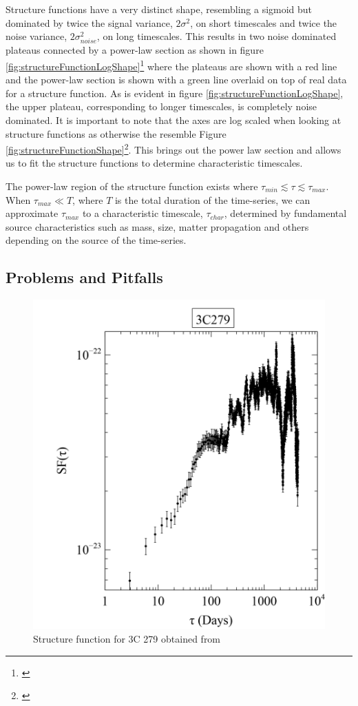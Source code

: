 \documentclass[12pt, oneside]{smuthesis}
\begin{document}
Structure functions have a very distinct shape, resembling a sigmoid but dominated by twice the signal variance, $2\sigma^{2}$, on short timescales and twice the noise variance, $2\sigma_{noise}^{2}$, on long timescales. This results in two noise dominated plateaus connected by a power-law section as shown in figure \ref{fig:structureFunctionLogShape}\footnote{\cite{galloblue}} where the plateaus are shown with a red line and the power-law section is shown with a green line overlaid on top of real data for a structure function. As is evident in figure \ref{fig:structureFunctionLogShape}, the upper plateau, corresponding to longer timescales, is completely noise dominated. It is important to note that the axes are log scaled when looking at structure functions as otherwise the resemble Figure \ref{fig:structureFunctionShape}\footnote{\cite{galloblue}}. This brings out the power law section and allows us to fit the structure functions to determine characteristic timescales.

The power-law region of the structure function exists where $\tau_{min}\lesssim\tau\lesssim\tau_{max}$. When $\tau_{max}\ll T$, where $T$ is the total duration of the time-series, we can approximate $\tau_{max}$ to a characteristic timescale, $\tau_{char}$, determined by fundamental source characteristics such as mass, size, matter propagation and others depending on the source of the time-series.

\subsection{\sc Problems and Pitfalls} \label{problemsAndPitfalls}

\begin{figure}[H]
	\centering
	\includegraphics[width=0.6\linewidth]{3C279structurefunction}
	\caption{Structure function for 3C 279 obtained from \cite{rxtepaper}}
	\label{fig:3c279sf}
\end{figure}
\end{document}
